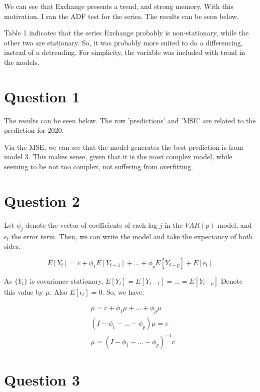 \documentclass[12pt]{article}
\begin{document}
We can see that Exchange presents a trend, and strong memory. With this motivation, I ran the ADF test for the series. The results can be seen below.





Table 1 indicates that the series Exchange  probably is non-stationary, while the other two are stationary. So, it was probably more suited to do a differencing, instead of a detrending. For simplicity, the variable was included with trend in the models.



\section*{Question 1}

The results can be seen below. The row 'predictions' and 'MSE' are related to the prediction for 2020.



Via the MSE, we can see that the model generates the best prediction is from model 3. This makes sense, given that it is the most complex model, while seeming to be not too complex, not suffering from overfitting.



\section*{Question 2}

Let $\phi_j$ denote the vector of coefficients of each lag $j$ in the $VAR(p)$ model, and $\epsilon_t$ the error term. Then, we can write the model and take the expectancy of both sides:

$$
E[Y_t] = c + \phi_1E[Y_{t-1}] + \dots + \phi_pE[Y_{t-p}] + E[\epsilon_t]
$$

As $\{Y_t\}$ is covariance-stationary, $E[Y_{t}] = E[Y_{t-1}] = \dots = E[Y_{t-p}]$ Denote this value by $\mu$. Also $E[\epsilon_t] = 0$. So, we have:

\begin{align*}
    &\mu = c + \phi_1\mu + \dots + \phi_p\mu\\
    &(I - \phi_1 - \dots - \phi_p)\mu = c\\
    &\mu = (I - \phi_1 - \dots - \phi_p)^{-1}c
\end{align*}




\section*{Question 3}
\end{document}
